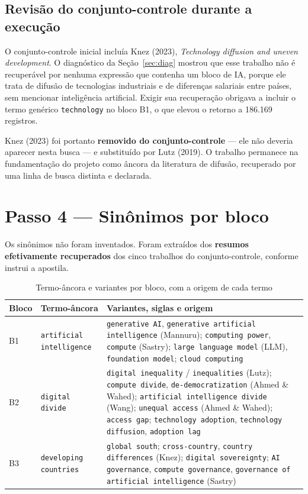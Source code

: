 \documentclass[12pt,a4paper]{article}
\begin{document}
\subsection{Revisão do conjunto-controle durante a execução}

O conjunto-controle inicial incluía Knez (2023), \textit{Technology diffusion and uneven
development}. O diagnóstico da Seção~\ref{sec:diag} mostrou que esse trabalho não é
recuperável por nenhuma expressão que contenha um bloco de IA, porque ele trata de difusão
de tecnologias industriais e de diferenças salariais entre países, sem mencionar
inteligência artificial. Exigir sua recuperação obrigava a incluir o termo genérico
\texttt{technology} no bloco B1, o que elevou o retorno a 186.169 registros.

Knez (2023) foi portanto \textbf{removido do conjunto-controle} --- ele não deveria
aparecer nesta busca --- e substituído por Lutz (2019). O trabalho permanece na
fundamentação do projeto como âncora da literatura de difusão, recuperado por uma linha de
busca distinta e declarada.

\section{Passo 4 --- Sinônimos por bloco}

Os sinônimos não foram inventados. Foram extraídos dos \textbf{resumos efetivamente
recuperados} dos cinco trabalhos do conjunto-controle, conforme instrui a apostila.

\begin{table}[htbp]
\centering\footnotesize
\caption{Termo-âncora e variantes por bloco, com a origem de cada termo}
\begin{tabularx}{\textwidth}{l l Y}
\toprule
\textbf{Bloco} & \textbf{Termo-âncora} & \textbf{Variantes, siglas e origem} \\
\midrule
B1 & \texttt{artificial intelligence} &
\texttt{generative AI}, \texttt{generative artificial intelligence} (Mannuru);
\texttt{computing power}, \texttt{compute} (Sastry);
\texttt{large language model} (LLM), \texttt{foundation model};
\texttt{cloud computing} \\
\addlinespace
B2 & \texttt{digital divide} &
\texttt{digital inequality} / \texttt{inequalities} (Lutz);
\texttt{compute divide}, \texttt{de-democratization} (Ahmed \& Wahed);
\texttt{artificial intelligence divide} (Wang);
\texttt{unequal access} (Ahmed \& Wahed); \texttt{access gap};
\texttt{technology adoption}, \texttt{technology diffusion}, \texttt{adoption lag} \\
\addlinespace
B3 & \texttt{developing countries} &
\texttt{global south}; \texttt{cross-country}, \texttt{country differences} (Knez);
\texttt{digital sovereignty}; \texttt{AI governance}, \texttt{compute governance},
\texttt{governance of artificial intelligence} (Sastry) \\
\bottomrule
\end{tabularx}
\end{table}
\end{document}
